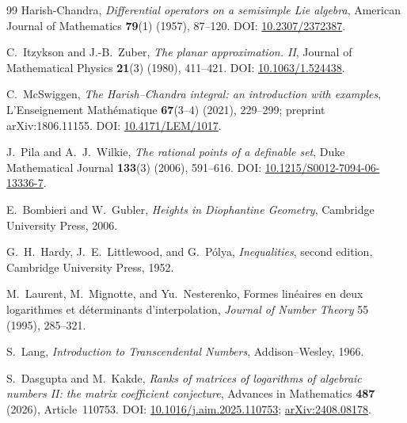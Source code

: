 \documentclass[11pt,oneside]{article}
\theoremstyle{definition}
\theoremstyle{remark}
\begin{document}
\begin{thebibliography}{99}
Harish-Chandra,
\newblock \emph{Differential operators on a semisimple Lie algebra},
\newblock American Journal of Mathematics \textbf{79}(1) (1957), 87--120.
\newblock DOI: \href{https://doi.org/10.2307/2372387}{10.2307/2372387}.

C.~Itzykson and J.-B.~Zuber,
\newblock \emph{The planar approximation. II},
\newblock Journal of Mathematical Physics \textbf{21}(3) (1980), 411--421.
\newblock DOI: \href{https://doi.org/10.1063/1.524438}{10.1063/1.524438}.

C.~McSwiggen,
\newblock \emph{The Harish--Chandra integral: an introduction with examples},
\newblock L'Enseignement Math\'ematique \textbf{67}(3--4) (2021), 229--299;
preprint arXiv:1806.11155.
\newblock DOI: \href{https://doi.org/10.4171/LEM/1017}{10.4171/LEM/1017}.

J.~Pila and A.~J.~Wilkie,
\newblock \emph{The rational points of a definable set},
\newblock Duke Mathematical Journal \textbf{133}(3) (2006), 591--616.
\newblock DOI: \href{https://doi.org/10.1215/S0012-7094-06-13336-7}{10.1215/S0012-7094-06-13336-7}.


E.~Bombieri and W.~Gubler,
\newblock \emph{Heights in Diophantine Geometry},
\newblock Cambridge University Press, 2006.

G.~H.~Hardy, J.~E.~Littlewood, and G.~P\'olya,
\newblock \emph{Inequalities}, second edition,
\newblock Cambridge University Press, 1952.

M.~Laurent, M.~Mignotte, and Yu.~Nesterenko,
\newblock Formes lin\'eaires en deux logarithmes et d\'eterminants
 d'interpolation,
\newblock \emph{Journal of Number Theory} 55 (1995), 285--321.

S.~Lang,
\newblock \emph{Introduction to Transcendental Numbers},
\newblock Addison--Wesley, 1966.


S.~Dasgupta and M.~Kakde,
\newblock \emph{Ranks of matrices of logarithms of algebraic numbers II: the matrix coefficient conjecture},
\newblock Advances in Mathematics \textbf{487} (2026), Article~110753.
\newblock DOI: \href{https://doi.org/10.1016/j.aim.2025.110753}{10.1016/j.aim.2025.110753};
\href{https://arxiv.org/abs/2408.08178}{arXiv:2408.08178}.




\end{thebibliography}
\end{document}
